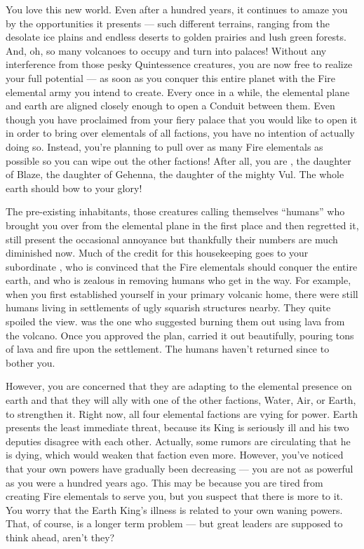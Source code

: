\documentclass[char]{elementals}
\begin{document}
\name{\cQueen{}}

You love this new world.  Even after a hundred years, it continues to amaze you by the opportunities it presents --- such different terrains, ranging from the desolate ice plains and endless deserts to golden prairies and lush green forests.  And, oh, so many volcanoes to occupy and turn into palaces!  Without any interference from those pesky Quintessence creatures, you are now free to realize your full potential --- as soon as you conquer this entire planet with the Fire elemental army you intend to create.  Every once in a while, the elemental plane and earth are aligned closely enough to open a Conduit between them.  Even though you have proclaimed from your fiery palace that you would like to open it in order to bring over elementals of all factions, you have no intention of actually doing so.  Instead, you're planning to pull over as many Fire elementals as possible so you can wipe out the other factions!  After all, you are \cQueen{}, the daughter of Blaze, the daughter of Gehenna, the daughter of the mighty Vul.  The whole earth should bow to your glory!

The pre-existing inhabitants, those creatures calling themselves ``humans'' who brought you over from the elemental plane in the first place and then regretted it, still present the occasional annoyance but thankfully their numbers are much diminished now.  Much of the credit for this housekeeping goes to your subordinate \cPyro{\intro}, who is convinced that the Fire elementals should conquer the entire earth, and who is zealous in removing humans who get in the way.  For example, when you first established yourself in your primary volcanic home, there were still humans living in settlements of ugly squarish structures nearby.  They quite spoiled the view.  \cPyro{} was the one who suggested burning them out using lava from the volcano.  Once you approved the plan, \cPyro{\they} carried it out beautifully, pouring tons of lava and fire upon the settlement.  The humans haven't returned since to bother you.

However, you are concerned that they are adapting to the elemental presence on earth and that they will ally with one of the other factions, Water, Air, or Earth, to strengthen it.  Right now, all four elemental factions are vying for power.  Earth presents the least immediate threat, because its King is seriously ill and his two deputies disagree with each other.  Actually, some rumors are circulating that he is dying, which would weaken that faction even more.  However, you've noticed that your own powers have gradually been decreasing --- you are not as powerful as you were a hundred years ago.  This may be because you are tired from creating Fire elementals to serve you, but you suspect that there is more to it.  You worry that the Earth King's illness is related to your own waning powers.  That, of course, is a longer term problem --- but great leaders are supposed to think ahead, aren't they?
\end{document}
